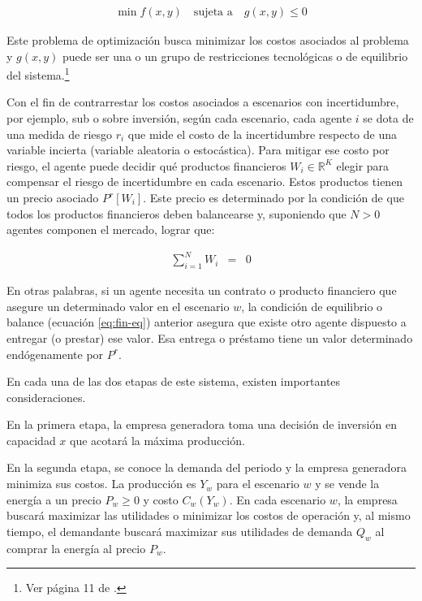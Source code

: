\begin{align}
\min f(x,y)\quad\text{sujeta a}\quad g(x,y)\leq 0
\end{align}


Este problema de optimización busca minimizar los costos asociados al problema y $g(x,y)$ puede ser una o un grupo de restricciones tecnológicas o de equilibrio del sistema.\footnote{Ver página 11 de .} 
\vspace{2.5mm}

Con el fin de contrarrestar los costos asociados a escenarios con incertidumbre, por ejemplo, sub o sobre inversión, según cada escenario, cada agente $i$ se dota de una medida de riesgo $r_{i}$ que mide el costo de la incertidumbre respecto de una variable incierta (variable aleatoria o estocástica). Para mitigar ese costo por riesgo, el agente puede decidir qué productos financieros $W_i\in\mathbb{R}^K$ elegir para compensar el riesgo de incertidumbre en cada escenario. Estos productos tienen un precio asociado $P^{r}[W_i]$. Este precio es determinado por la condición de que todos los productos financieros deben balancearse y, suponiendo que $N>0$ agentes componen el mercado, lograr que:

\begin{eqnarray}
\sum_{i=1}^{N}W_{i} &=& 0\label{eq:fin-eq}    
\end{eqnarray}

En otras palabras, si un agente necesita un contrato o producto financiero que asegure un determinado valor en el escenario $w$, la condición de equilibrio o balance (ecuación \ref{eq:fin-eq}) anterior asegura que existe otro agente dispuesto a entregar (o prestar) ese valor. Esa entrega o préstamo tiene un valor determinado endógenamente por $P^r$.\vspace{2.5mm}

En cada una de las dos etapas de este sistema, existen importantes consideraciones.
\vspace{2.5mm}

En la primera etapa, la empresa generadora toma una decisión de inversión en capacidad $x$ que acotará la máxima producción. 
\vspace{2.5mm}

En la segunda etapa, se conoce la demanda del periodo y la empresa generadora minimiza sus costos. La producción es $Y_{w}$ para el escenario $w$ y se vende la energía a un precio $P_{w}\geq 0$ y costo $C_{w}(Y_{w})$. En cada escenario $w$, la empresa buscará maximizar las utilidades o minimizar los costos de operación y, al mismo tiempo, el demandante buscará maximizar sus utilidades de demanda $Q_{w}$ al comprar la energía al precio $P_{w}$.


